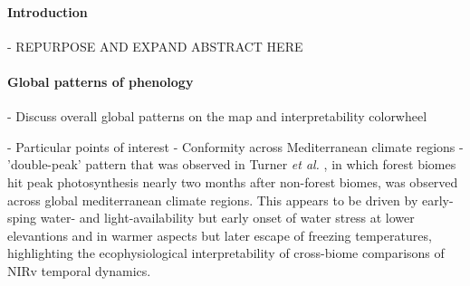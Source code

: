 \documentclass[12pt]{article}
\begin{document}

\paragraph*{Introduction}

- REPURPOSE AND EXPAND ABSTRACT HERE

\paragraph*{Global patterns of phenology}

- Discuss overall global patterns on the map and interpretability colorwheel

- Particular points of interest
  - Conformity across Mediterranean climate regions
    - 'double-peak' pattern that was observed in Turner \textit{et al.} \cite{turner}, in which forest biomes hit peak photosynthesis nearly two months after non-forest biomes, was observed across global mediterranean climate regions. This appears to be driven by early-sping water- and light-availability but early onset of water stress at lower elevantions and in warmer aspects but later escape of freezing temperatures, highlighting the ecophysiological interpretability of cross-biome comparisons of NIRv temporal dynamics.
\end{document}
